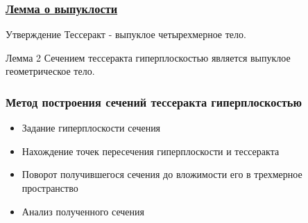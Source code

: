 \documentclass[10pt,pdf,hyperref={unicode}]{beamer}
\begin{document}
\begin{frame}
	\frametitle{\hyperlink{vipuk}{Лемма о выпуклости}}
	\hypertarget{vipuk_back}{}

	\begin{alertblock}{Утверждение}
		Тессеракт - выпуклое четырехмерное тело.
	\end{alertblock}

	\begin{block}{Лемма 2}
		Сечением тессеракта гиперплоскостью является выпуклое геометрическое тело.
	\end{block}
\end{frame}
\begin{frame}
	\frametitle{Метод построения сечений тессеракта гиперплоскостью}
	\begin{itemize}
		\item Задание гиперплоскости сечения
		\item Нахождение точек пересечения гиперплоскости и тессеракта
		\item Поворот получившегося сечения до вложимости его в трехмерное пространство
		\item Анализ полученного сечения
	\end{itemize}
\end{frame}
\end{document}
